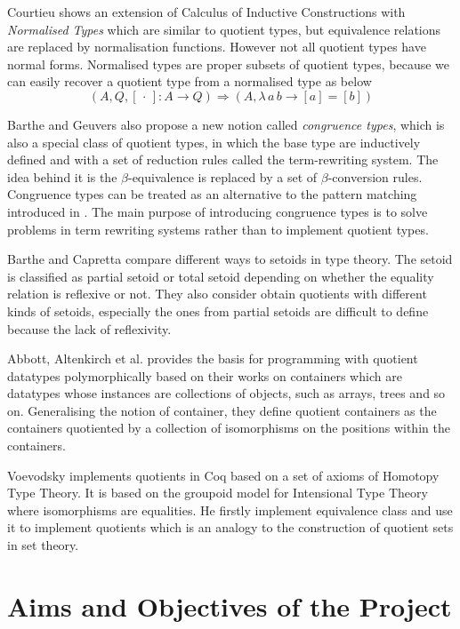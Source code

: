 \documentclass{article}
\theoremstyle{definition}
\newcommand{\dotph}{\,\cdot\,}
\providecommand{\class}[1]{[#1]}
\newcommand{\itt}{Intensional Type Theory}
\begin{document}
Courtieu \cite{cou:01} shows an extension of Calculus of Inductive Constructions
with \emph{Normalised Types} which are similar to quotient types, but equivalence relations are replaced by normalisation functions. 
However not all quotient types have normal forms. Normalised types are
proper subsets of quotient types, because we can easily recover a quotient
type from a normalised type as below
\[ (A, Q, \class\dotph \colon A \to Q) \Rightarrow(A, \lambda \,a \,b\to \class a = \class b)\]


Barthe and Geuvers \cite{bar:96} also propose a new notion called
\emph{congruence types}, which is also a special class of quotient
types, in which the base type are inductively defined and with a set
of reduction rules called the term-rewriting system. The idea behind
it is the $\beta$-equivalence is replaced by a set of
$\beta$-conversion rules. Congruence types can be treated as an
alternative to the pattern matching introduced in \cite{coq:92}. The main
purpose of introducing congruence types is to solve problems in
term rewriting systems rather than to implement quotient types.


Barthe and Capretta \cite{bar:03} compare different ways to setoids in type theory.
The setoid is classified as partial setoid or total setoid depending
on whether the equality relation is reflexive or not. They also
consider obtain quotients with different kinds of setoids, especially
the ones from partial setoids are difficult to define because the lack
of reflexivity.

Abbott, Altenkirch et al. \cite{abb:04} provides the basis for
programming with quotient datatypes polymorphically based on their
works on containers which are datatypes whose instances are
collections of objects, such as arrays, trees and so on. Generalising
the notion of container, they define quotient containers as the
containers quotiented by a collection of isomorphisms on the positions
within the containers.

Voevodsky \cite{voe:hset} implements quotients in Coq based on a set
of axioms of Homotopy Type Theory. It is based on the groupoid model
for \itt{} where isomorphisms are equalities. He firstly implement
equivalence class and use it to implement quotients which is an
analogy to the construction of quotient sets in set theory. 

\section{Aims and Objectives of the Project}
\label{sec:ob}
\end{document}
